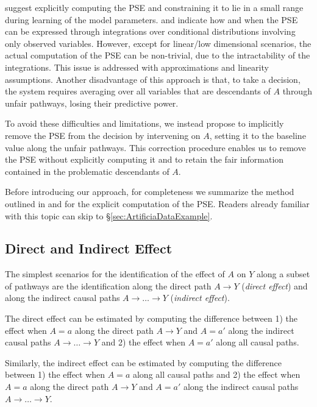\documentclass{article}
\newcommand{\secref}[1]{\S \ref{#1}}
\begin{document}
\citet{nabi18fair} suggest explicitly computing the PSE and constraining it to lie in a small range during learning of the model parameters. 
\citet{pearl01direct,pearl12causal} and \citet{shpitser13counterfactual} indicate how and when the PSE can be expressed through integrations over conditional distributions involving only observed variables. 
However, except for linear/low dimensional scenarios, the actual computation of the PSE can be non-trivial, due to the intractability of the integrations. 
This issue is addressed with approximations and linearity assumptions. 
Another disadvantage of this approach is that, to take a decision, the system requires averaging over all variables that are descendants of $A$ through unfair pathways, losing their predictive power.

To avoid these difficulties and limitations, we instead propose to implicitly remove the PSE from the decision by intervening on $A$, setting it to the baseline value along the unfair pathways.
This correction procedure enables us to remove the PSE without explicitly computing it and to retain the fair information contained in the problematic descendants of $A$.

Before introducing our approach, for completeness we summarize the method outlined in \citet{pearl01direct,pearl12causal} and \citet{shpitser13counterfactual} for the explicit computation of the PSE.
Readers already familiar with this topic can skip to \secref{sec:ArtificiaDataExample}.

\subsection{Direct and Indirect Effect}
The simplest scenarios for the identification of the effect of $A$ on $Y$ along a subset of pathways are the identification along the direct path $A\rightarrow Y$ (\emph{direct effect}) and along the indirect causal paths $A\rightarrow\ldots\rightarrow Y$ (\emph{indirect effect}).

The direct effect can be estimated by computing the difference between 1) the effect when $A=a$ along the direct path $A\rightarrow Y$ and $A=a'$ along the indirect causal paths $A\rightarrow\ldots\rightarrow Y$
and 2) the effect when $A=a'$ along all causal paths. 

Similarly, the indirect effect can be estimated by computing the difference between 1) the effect when $A=a$ along all causal paths and 2) the effect when $A=a$ along the direct path $A\rightarrow Y$ and $A=a'$ along the indirect causal paths $A\rightarrow\ldots\rightarrow Y$.
\end{document}

